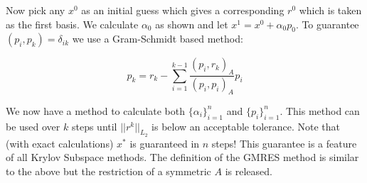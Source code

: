 \documentclass[a4paper, 12pt]{article}
\begin{document}
\noindent
Now pick any $x^0$ as an initial guess which gives 
a corresponding $r^0$ which is taken as the first basis.
We calculate $\alpha_0$ as shown and let $x^1=x^0+\alpha_0 p_0$.
To guarantee $(p_i,p_k)=\delta_{ik}$ we use a 
Gram-Schmidt based method:

\begin{equation}
p_k = r_k - \sum_{i=1}^{k-1} \frac{ (p_i,r_k)_A}{ (p_i,p_i)_A} p_i
\end{equation}

\noindent
We now have a method to calculate both $\{\alpha_i\}_{i=1}^n$ 
and  $\{p_i\}_{i=1}^n$.
This method  can be used over $k$ steps until $||r^k||_{L_2}$
is below an acceptable tolerance. 
Note that (with exact calculations) $x^*$ is guaranteed in $n$ steps!
This guarantee is a feature of all Krylov Subspace methods.
The definition of the GMRES method is similar to the 
above but the restriction of a symmetric $A$ is released.
\end{document}
